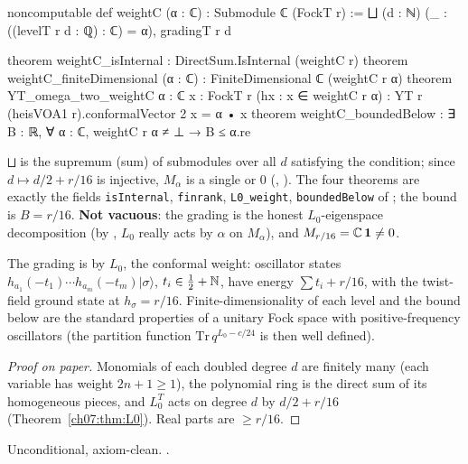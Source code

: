 \begin{leancode}
noncomputable def weightC (α : ℂ) : Submodule ℂ (FockT r) :=
  ⨆ (d : ℕ) (_ : ((levelT r d : ℚ) : ℂ) = α), gradingT r d

theorem weightC_isInternal : DirectSum.IsInternal (weightC r)
theorem weightC_finiteDimensional (α : ℂ) : FiniteDimensional ℂ (weightC r α)
theorem YT_omega_two_weightC {α : ℂ} {x : FockT r} (hx : x ∈ weightC r α) :
    YT r (heisVOA1 r).conformalVector 2 x = α • x
theorem weightC_boundedBelow :
    ∃ B : ℝ, ∀ α : ℂ, weightC r α ≠ ⊥ → B ≤ α.re
\end{leancode}

\begin{dictionary}
\verb|⨆| is the supremum (sum) of submodules over all $d$ satisfying the condition; since
$d\mapsto d/2+r/16$ is injective, $M_\alpha$ is a single  or $0$
(, ). The four theorems are exactly the fields
\verb|isInternal|, \verb|finrank|, \verb|L0_weight|, \verb|boundedBelow| of
; the bound is $B = r/16$. \textbf{Not vacuous}: the grading is the honest
$L_0$-eigenspace decomposition (by , $L_0$ really acts by $\alpha$ on
$M_\alpha$), and $M_{r/16} = {\mathbb{C}}\,\mathbf 1\ne0$.
\end{dictionary}

\begin{physics}
The grading is by $L_0$, the conformal weight: oscillator states $h_{a_1}(-t_1)\cdots h_{a_m}(-t_m)|\sigma\rangle$, $t_i\in\tfrac12+{\mathbb{N}}$, have energy $\sum t_i+r/16$, with the twist-field ground state at $h_\sigma=r/16$. Finite-dimensionality of each level and the bound below are the standard properties of a unitary Fock space with positive-frequency oscillators (the partition function $\mathrm{Tr}\,q^{L_0-c/24}$ is then well defined).
\end{physics}

\begin{proof}[Proof on paper]
Monomials of each doubled degree $d$ are finitely many (each variable has weight $2n+1\ge1$), the
polynomial ring is the direct sum of its homogeneous pieces, and $L_0^T$ acts on degree $d$ by
$d/2+r/16$ (Theorem~\ref{ch07:thm:L0}). Real parts are $\ge r/16$.
\end{proof}

\begin{status}
Unconditional, axiom-clean. .
\end{status}


